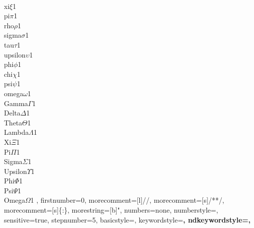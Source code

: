 {        {\\xi}{$\xi$}1
        {\\pi}{$\pi$}1
        {\\rho}{$\rho$}1
        {\\sigma}{$\sigma$}1
        {\\tau}{$\tau$}1
        {\\upsilon}{$\upsilon$}1
        {\\phi}{$\phi$}1
        {\\chi}{$\chi$}1
        {\\psi}{$\psi$}1
        {\\omega}{$\omega$}1
        {\\Gamma}{$\Gamma$}1
        {\\Delta}{$\Delta$}1
        {\\Theta}{$\Theta$}1
        {\\Lambda}{$\Lambda$}1
        {\\Xi}{$\Xi$}1
        {\\Pi}{$\Pi$}1
        {\\Sigma}{$\Sigma$}1
        {\\Upsilon}{$\Upsilon$}1
        {\\Phi}{$\Phi$}1
        {\\Psi}{$\Psi$}1
        {\\Omega}{$\Omega$}1
    ,
    firstnumber=0,
    morecomment=[l]{//},
    morecomment=[s]{/*}{*/},
    morecomment=[s]{\{:}{\}},
    morestring=[b]",
    numbers=none,
    numberstyle=\tiny,
    sensitive=true,  %
    stepnumber=5,
    basicstyle=\small\ttfamily\linespread{4},
    keywordstyle=\bfseries,
    ndkeywordstyle=\bfseries,
}
